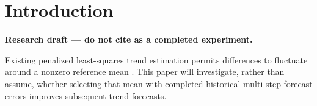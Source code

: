 \section{Introduction}
\textbf{Research draft --- do not cite as a completed experiment.}

Existing penalized least-squares trend estimation permits differences
to fluctuate around a nonzero reference mean \citep{guerrero2007smoothing}.
This paper will investigate, rather than assume, whether selecting
that mean with completed historical multi-step forecast errors
improves subsequent trend forecasts.
